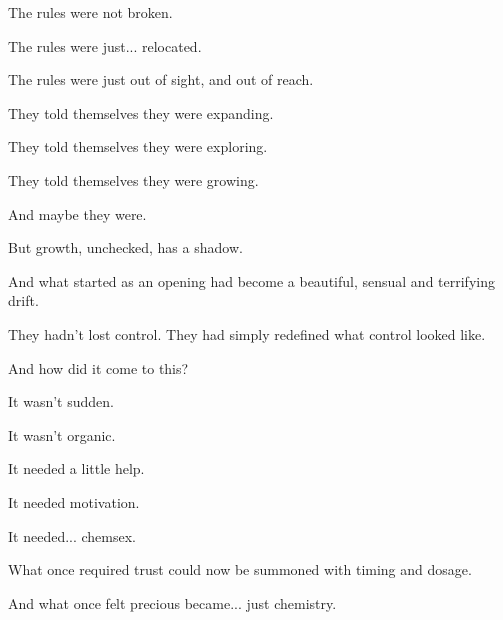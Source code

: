 The rules were not broken.

The rules were just... relocated.

The rules were just out of sight, and out of reach.

They told themselves they were expanding. 

They told themselves they were exploring. 

They told themselves they were growing.

And maybe they were.

But growth, unchecked, has a shadow.

And what started as an opening had become a beautiful, sensual and terrifying drift.

They hadn’t lost control.
They had simply redefined what control looked like.

And how did it come to this?

It wasn’t sudden.

It wasn’t organic.

It needed a little help.

It needed motivation.

It needed... chemsex.

What once required trust could now be summoned with timing and dosage.

And what once felt precious became... just chemistry.

\medskip

